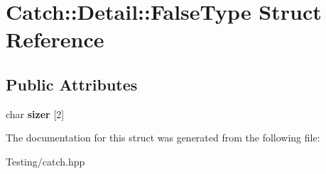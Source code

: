 \hypertarget{struct_catch_1_1_detail_1_1_false_type}{\section{Catch\-:\-:Detail\-:\-:False\-Type Struct Reference}
\label{struct_catch_1_1_detail_1_1_false_type}
}
\subsection*{Public Attributes}
\begin{DoxyCompactItemize}
\item 
\hypertarget{struct_catch_1_1_detail_1_1_false_type_abc1a730e197d6f7750ae8aaf47b63477}{char {\bfseries sizer} \mbox{[}2\mbox{]}}\label{struct_catch_1_1_detail_1_1_false_type_abc1a730e197d6f7750ae8aaf47b63477}

\end{DoxyCompactItemize}


The documentation for this struct was generated from the following file\-:\begin{DoxyCompactItemize}
\item 
Testing/catch.\-hpp\end{DoxyCompactItemize}
